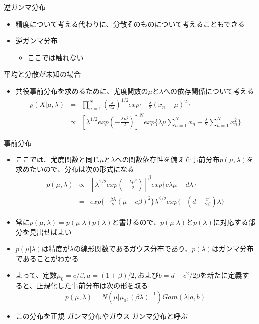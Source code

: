 \begin{frame}{逆ガンマ分布}
 \begin{itemize}
  \item 精度について考える代わりに、分散そのものについて考えることもできる
  \item 逆ガンマ分布
        \begin{itemize}
         \item ここでは触れない
        \end{itemize}
 \end{itemize}
\end{frame}

\begin{frame}{平均と分散が未知の場合}
 \begin{itemize}
  \item 共役事前分布を求めるために、尤度関数の$\mu$と$\lambda$への依存関係について考える
        \begin{eqnarray}
         p(X|\mu,\lambda) &=& \prod_{n=1}^{N}(\frac{\lambda}{2\pi})^{1/2}exp\{-\frac{\lambda}{2}(x_n-\mu)^2\} \nonumber \\
         &\propto & [\lambda^{1/2}exp(-\frac{\lambda\mu^2}{2})]^{N}exp\{\lambda\mu\sum_{n=1}^{N}x_n-\frac{\lambda}{2}\sum_{n=1}^{N}x_n^2\}
        \end{eqnarray}
 \end{itemize}
\end{frame}

\begin{frame}{事前分布}
 \begin{itemize}
  \item ここでは、尤度関数と同じ$\mu$と$\lambda$への関数依存性を備えた事前分布$p(\mu,\lambda)$を求めたいので、分布は次の形式になる
        \begin{eqnarray}
         p(\mu,\lambda) &\propto& [\lambda^{1/2}exp(-\frac{\lambda\mu^2}{2})]^\beta exp\{c\lambda\mu-d\lambda\}\\
         &= & exp\{-\frac{\beta\lambda}{2}(\mu-c\beta)^2\}\lambda^{\beta/2}exp\{-(d-\frac{c^2}{2\beta})\lambda\}
        \end{eqnarray}
  \item 常に$p(\mu,\lambda)=p(\mu|\lambda)p(\lambda)$と書けるので、$p(\mu|\lambda)$と$p(\lambda)$に対応する部分を見出せばよい
  \item $p(\mu|\lambda)$は精度が$\lambda$の線形関数であるガウス分布であり、$p(\lambda)$はガンマ分布であることがわかる
  \item よって、定数$\mu_0=c/\beta, a=(1+\beta)/2,$および$b=d-c^2/2\beta$を新たに定義すると、正規化した事前分布は次の形を取る
        \begin{equation}
         p(\mu,\lambda)=N(\mu|\mu_0, (\beta\lambda)^{-1})Gam(\lambda|a,b)
        \end{equation}
  \item この分布を正規-ガンマ分布やガウス-ガンマ分布と呼ぶ
 \end{itemize}
\end{frame}

